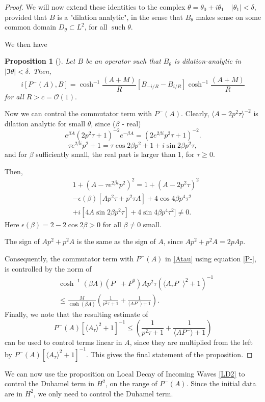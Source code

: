 \documentclass[11pt]{article}
\newtheorem{proposition}[theorem]{Proposition}
\begin{document}
\begin{proof}
We will now extend these identities to the complex $\theta=\theta_{0}+i \theta_{1} \quad\left|\theta_{1}\right|<\delta$, provided that $B$ is a "dilation analytic", in the sense that $B_{\theta}$ makes sense on some common domain $D_{\theta} \subset L^{2}$, for all $\operatorname{such} \theta$.

We then have
\begin{proposition}[\cite{soffer2011monotonic}]
Let $B$ be an operator such that $B_{\theta}$ is dilation-analytic in $|\Im \theta|<\delta.$
Then,
\begin{equation}\label{P-}
    i[P^-(A),B]=\cosh^{-1}\frac{(A+M)}{R}[B_{-i/R}-B_{i/R}]\cosh^{-1}\frac{(A+M)}{R}
\end{equation}
for all $R>c=\mathcal{O}(1).$
\end{proposition}

Now we can control the commutator term with $P^-(A).$
Clearly, $\langle A-2p^2\tau\rangle^{-2}$ is dilation analytic for small $\theta$, since ($\beta$ - real)
$$
e^{\beta A}(2p^2\tau +1)^{-2}e^{-\beta A}=(2e^{2\beta i}p^2\tau+1)^{-2}.
$$
$$
\tau e^{2\beta i}p^2+1=\tau \cos{2\beta}p^2+1+i\sin{2\beta}p^2\tau,
$$
and for $\beta$  sufficiently small, the real part is larger than 1, for $\tau\geq 0.$

Then,
\begin{align*}
& 1+(A- \tau e^{2\beta i}p^2)^2=1+(A-2p^2\tau)^2\\
&-\epsilon(\beta)[Ap^2\tau+p^2\tau A]+4\cos{4\beta}p^4\tau^2\\
&+i[4A\sin{2\beta}p^2\tau]+4\sin{4\beta}p^4\tau^2]\neq 0.
\end{align*}
Here $\epsilon(\beta)=2-2\cos{2\beta}>0$ for all $\beta \neq 0$ small.

The sign of $Ap^2+p^2A$ is the same as the sign of $A$, since $Ap^2+p^2A=2pAp.$

Consequently, the commutator term with $P^-(A)$ in \eqref{Atau} using equation \eqref{P-},
is controlled by the norm of 
\begin{align*}
& \cosh^{-1}{(\beta A)}(P^-+P^0)Ap^2\tau\left(\langle A_{\tau}P^-\rangle^2+1\right)^{-1}\\ 
&\leq \frac{M}{\cosh{(\beta A)}}\left(\frac{1}{p^2\tau+1}+\frac{1}{\langle AP^-\rangle +1}\right ).
\end{align*}
Finally, we note that the resulting estimate of
$$
P^-(A)[\langle A_{\tau}\rangle^2+1]^{-1}\leq \left(\frac{1}{p^2\tau+1}+\frac{1}{\langle AP^-\rangle +1}\right )
$$
can be used to control terms linear in $A$, since they are multiplied from the left by $P^-(A)[\langle A_{\tau}\rangle^2+1]^{-1}.$
This gives the final statement of the proposition. \end{proof}
We can now use the proposition on Local Decay of Incoming Waves \eqref{LD2} to control the Duhamel term in $H^{2}$, on the range of $P^{-}(A)$.
Since the initial data are in $H^{2}$, we only need to control the Duhamel term.
\end{document}
